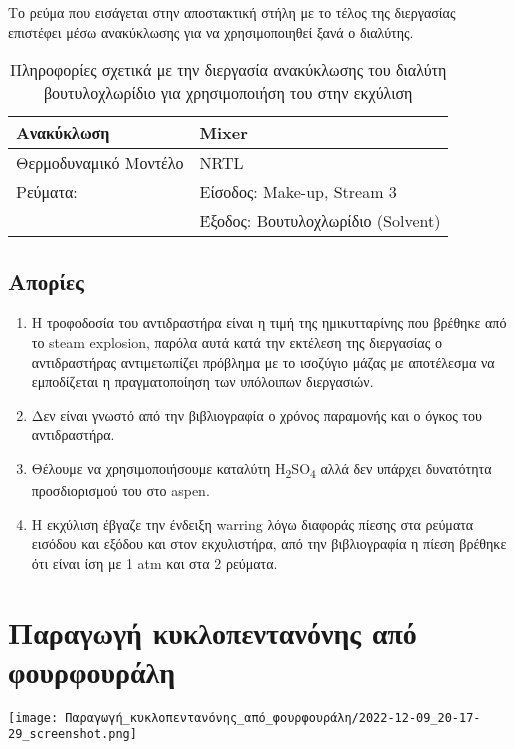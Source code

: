 \documentclass[11pt]{article}
\begin{document}
Το ρεύμα που εισάγεται στην αποστακτική στήλη με το τέλος της διεργασίας
επιστέφει μέσω ανακύκλωσης για να χρησιμοποιηθεί ξανά ο διαλύτης.

\begin{table}[htbp]
\caption{Πληροφορίες σχετικά με την διεργασία ανακύκλωσης του διαλύτη βουτυλοχλωρίδιο για χρησιμοποιήση του στην εκχύλιση}
\centering
\begin{tabular}{ll}
Ανακύκλωση & Mixer\\
\hline
Θερμοδυναμικό Μοντέλο & NRTL\\
Ρεύματα: & Είσοδος: Make-up, Stream 3\\
 & Έξοδος: Βουτυλοχλωρίδιο (Solvent)\\
\end{tabular}
\end{table}

\subsection{Απορίες}
\label{sec:org3f5cd72}
\begin{enumerate}
\item Η τροφοδοσία του αντιδραστήρα είναι η τιμή της ημικυτταρίνης που
βρέθηκε από το steam explosion, παρόλα αυτά κατά την εκτέλεση της
διεργασίας ο αντιδραστήρας αντιμετωπίζει πρόβλημα με το ισοζύγιο
μάζας με αποτέλεσμα να εμποδίζεται η πραγματοποίηση των υπόλοιπων
διεργασιών.

\item Δεν είναι γνωστό από την βιβλιογραφία ο χρόνος παραμονής και ο όγκος
του αντιδραστήρα.

\item Θέλουμε να χρησιμοποιήσουμε καταλύτη H\textsubscript{2}SO\textsubscript{4} αλλά δεν υπάρχει
δυνατότητα προσδιορισμού του στο aspen.

\item Η εκχύλιση έβγαζε την ένδειξη warring λόγω διαφοράς πίεσης στα
ρεύματα εισόδου και εξόδου και στον εκχυλιστήρα, από την βιβλιογραφία
η πίεση βρέθηκε ότι είναι ίση με 1 atm και στα 2 ρεύματα.
\end{enumerate}

\section{Παραγωγή κυκλοπεντανόνης από φουρφουράλη}
\label{sec:orga595858}

\begin{center}
\texttt{[image: Παραγωγή\_κυκλοπεντανόνης\_από\_φουρφουράλη/2022-12-09\_20-17-29\_screenshot.png]}
\end{center}
\end{document}
